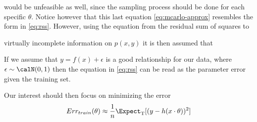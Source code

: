 would be unfeasible as well, since the sampling process should be done for each specific $\theta$. Notice however that this last equation \ref{eq:mcarlo-approx} resembles the form in \ref{eq:rss}. However, using the equation from the residual sum of squares to 


virtually  incomplete information on $p(x,y)$ it is then assumed that 

If we assume that $y  =  f(x)  +  \epsilon $ is a good relationship for our data, where $\epsilon \sim \calN(0,1) $ then the equation in \ref{eq:rss} can be read as the parameter error given the training set.

Our interest should then focus on minimizing the error
\[
Err_{train}(\theta) \approx \frac{1}{n} \Expect_{ \mathrm{T}}[(y - h(x \cdot \theta) )^2]
\]



